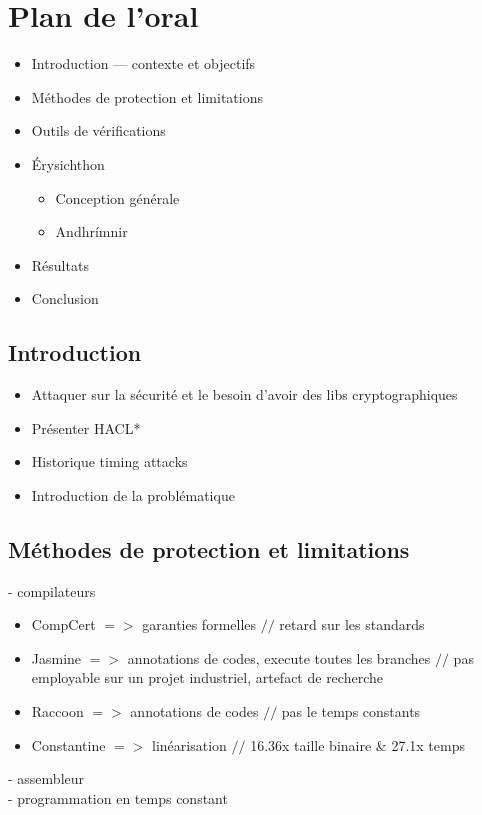 \documentclass[10pt,a5paper]{article}
\begin{document}
\section*{Plan de l'oral}

\begin{itemize}
  \item Introduction — contexte et objectifs
  \item Méthodes de protection et limitations
  \item Outils de vérifications
  \item Érysichthon
  \begin{itemize}
    \item Conception générale
    \item Andhrímnir
  \end{itemize}
  \item Résultats
  \item Conclusion
\end{itemize}

\subsection*{Introduction}
\begin{multicols}{2}
  \begin{itemize}
    \item Attaquer sur la sécurité et le besoin d'avoir des libs cryptographiques
    \item Présenter HACL*
    \item Historique timing attacks
    \item Introduction de la problématique
  \end{itemize}
\end{multicols}

\subsection*{Méthodes de protection et limitations}
- compilateurs
\begin{multicols}{2}
\begin{itemize}
  \item CompCert $=>$ garanties formelles $//$ retard sur les standards
  \item Jasmine $=>$ annotations de codes, execute toutes les branches $//$ pas employable sur un projet industriel, artefact de recherche
  \item Raccoon $=>$ annotations de codes $//$ pas le temps constants
  \item Constantine $=>$ linéarisation $//$ 16.36x taille binaire \& 27.1x temps
\end{itemize}
\end{multicols}
- assembleur\\
- programmation en temps constant 
\end{document}
